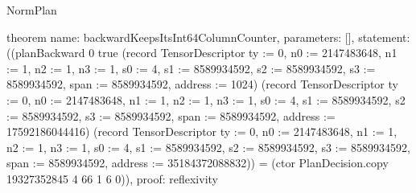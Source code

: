 \begin{lexlean}{NormPlan}
\begin{semanticmodule}
theorem{
  name: backwardKeepsItsInt64ColumnCounter,
  parameters: [],
  statement: ((planBackward 0 true (record TensorDescriptor {ty := 0, n0 := 2147483648, n1 := 1, n2 := 1, n3 := 1, s0 := 4, s1 := 8589934592, s2 := 8589934592, s3 := 8589934592, span := 8589934592, address := 1024}) (record TensorDescriptor {ty := 0, n0 := 2147483648, n1 := 1, n2 := 1, n3 := 1, s0 := 4, s1 := 8589934592, s2 := 8589934592, s3 := 8589934592, span := 8589934592, address := 17592186044416}) (record TensorDescriptor {ty := 0, n0 := 2147483648, n1 := 1, n2 := 1, n3 := 1, s0 := 4, s1 := 8589934592, s2 := 8589934592, s3 := 8589934592, span := 8589934592, address := 35184372088832})) = (ctor PlanDecision.copy 19327352845 4 66 1 6 0)),
  proof: reflexivity{}
}
\end{semanticmodule}
\end{lexlean}
